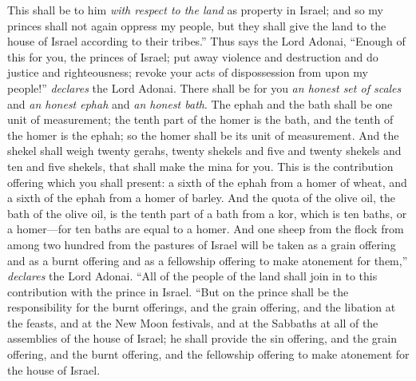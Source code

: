 \begin{biblechapter}
\verse This shall be to him \textit{with respect to the land} as property in Israel; and so my princes shall not again oppress my people, but they shall give the land to the house of Israel according to their tribes.”
\verse Thus says the Lord Adonai, “Enough of this for you, the princes of Israel; put away violence and destruction and do justice and righteousness; revoke your acts of dispossession from upon my people!” \textit{declares} the Lord Adonai.
\verse There shall be for you \textit{an honest set of scales} and \textit{an honest ephah} and \textit{an honest bath}.
\verse The ephah and the bath shall be one unit of measurement; the tenth part of the homer is the bath, and the tenth of the homer is the ephah; so the homer shall be its unit of measurement.
\verse And the shekel shall weigh twenty gerahs, twenty shekels and five and twenty shekels and ten and five shekels, that shall make the mina for you.
\verse This is the contribution offering which you shall present: a sixth of the ephah from a homer of wheat, and a sixth of the ephah from a homer of barley.
\verse And the quota of the olive oil, the bath of the olive oil, is the tenth part of a bath from a kor, which is ten baths, or a homer—for ten baths are equal to a homer.
\verse And one sheep from the flock from among two hundred from the pastures of Israel will be taken as a grain offering and as a burnt offering and as a fellowship offering to make atonement for them,” \textit{declares} the Lord Adonai.
\verse “All of the people of the land shall join in to this contribution with the prince in Israel.
\verse “But on the prince shall be the responsibility for the burnt offerings, and the grain offering, and the libation at the feasts, and at the New Moon festivals, and at the Sabbaths at all of the assemblies of the house of Israel; he shall provide the sin offering, and the grain offering, and the burnt offering, and the fellowship offering to make atonement for the house of Israel.

\end{biblechapter}

